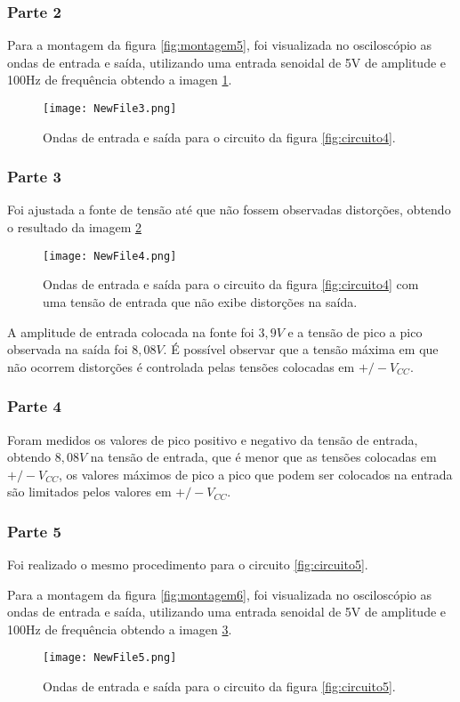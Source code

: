 \documentclass{abntex2}
\begin{document}
\subsubsection{Parte 2}
Para a montagem da figura \ref{fig:montagem5}, foi visualizada no osciloscópio as ondas de entrada e saída, utilizando uma entrada senoidal de 5V de amplitude e 100Hz de frequência obtendo a imagen \ref{fig:inout3}.
\begin{figure}[h]
  \centering
  \texttt{[image: NewFile3.png]}
  \caption{Ondas de entrada e saída para o circuito da figura \ref{fig:circuito4}.}
  \label{fig:inout3}
\end{figure}

\subsubsection{Parte 3}

Foi ajustada a fonte de tensão até que não fossem observadas distorções, obtendo o resultado da imagem \ref{fig:inout4}
\begin{figure}[h]
  \centering
  \texttt{[image: NewFile4.png]}
  \caption{Ondas de entrada e saída para o circuito da figura \ref{fig:circuito4} com uma tensão de entrada que não exibe distorções na saída.}
  \label{fig:inout4}
\end{figure}

A amplitude de entrada colocada na fonte foi $3,9V$ e a tensão de pico a pico observada na saída foi $8,08V$. É possível observar que a tensão máxima em que não ocorrem distorções é controlada pelas tensões colocadas em $+/-V_{CC}$.

\subsubsection{Parte 4}
Foram medidos os valores de pico positivo e negativo da tensão de entrada, obtendo $8,08V$ na tensão de entrada, que é menor que as tensões colocadas em $+/-V_{CC}$, os valores máximos de pico a pico que podem ser colocados na entrada são limitados pelos valores em $+/-V_{CC}$.

\subsubsection{Parte 5}
Foi realizado o mesmo procedimento para o circuito \ref{fig:circuito5}.

Para a montagem da figura \ref{fig:montagem6}, foi visualizada no osciloscópio as ondas de entrada e saída, utilizando uma entrada senoidal de 5V de amplitude e 100Hz de frequência obtendo a imagen \ref{fig:inout5}.
\begin{figure}[h]
  \centering
  \texttt{[image: NewFile5.png]}
  \caption{Ondas de entrada e saída para o circuito da figura \ref{fig:circuito5}.}
  \label{fig:inout5}
\end{figure}
\end{document}
